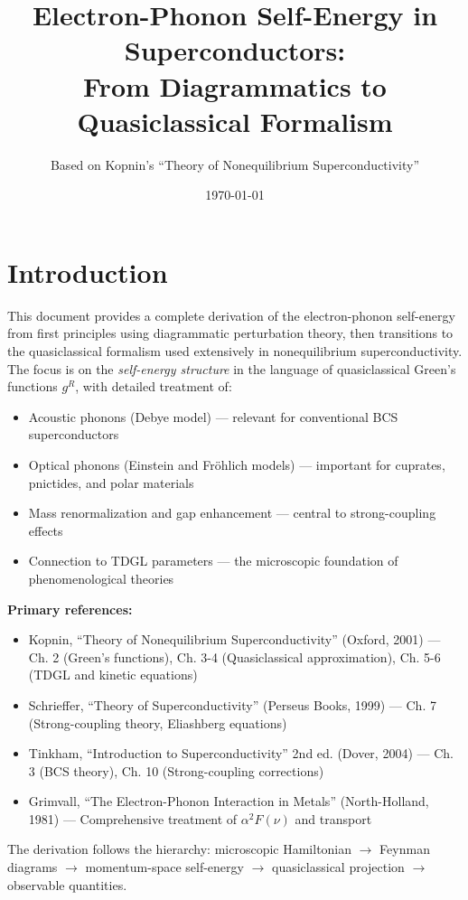 \documentclass[12pt]{article}
\title{Electron-Phonon Self-Energy in Superconductors:\\From Diagrammatics to Quasiclassical Formalism}
\author{Based on Kopnin's ``Theory of Nonequilibrium Superconductivity''}
\date{\today}
\begin{document}
\maketitle

\tableofcontents

\section{Introduction}

This document provides a complete derivation of the electron-phonon self-energy from first principles using diagrammatic perturbation theory, then transitions to the quasiclassical formalism used extensively in nonequilibrium superconductivity. The focus is on the \textit{self-energy structure} in the language of quasiclassical Green's functions $g^R$, with detailed treatment of:

\begin{itemize}
\item Acoustic phonons (Debye model) — relevant for conventional BCS superconductors
\item Optical phonons (Einstein and Fr\"ohlich models) — important for cuprates, pnictides, and polar materials
\item Mass renormalization and gap enhancement — central to strong-coupling effects
\item Connection to TDGL parameters — the microscopic foundation of phenomenological theories
\end{itemize}

\textbf{Primary references:}
\begin{itemize}
\item Kopnin, ``Theory of Nonequilibrium Superconductivity'' (Oxford, 2001) — Ch. 2 (Green's functions), Ch. 3-4 (Quasiclassical approximation), Ch. 5-6 (TDGL and kinetic equations)
\item Schrieffer, ``Theory of Superconductivity'' (Perseus Books, 1999) — Ch. 7 (Strong-coupling theory, Eliashberg equations)
\item Tinkham, ``Introduction to Superconductivity'' 2nd ed. (Dover, 2004) — Ch. 3 (BCS theory), Ch. 10 (Strong-coupling corrections)
\item Grimvall, ``The Electron-Phonon Interaction in Metals'' (North-Holland, 1981) — Comprehensive treatment of $\alpha^2F(\nu)$ and transport
\end{itemize}

The derivation follows the hierarchy: microscopic Hamiltonian $\to$ Feynman diagrams $\to$ momentum-space self-energy $\to$ quasiclassical projection $\to$ observable quantities.
\end{document}
